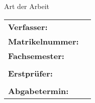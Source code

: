 \begin{titlepage}
    \begin{center}
    	\vfill
    	\begingroup
            \fontsize{14pt}{20pt}\selectfont
            {\bfseries \hochschule\par}
            {\bfseries \fakultaet\par}
            {\bfseries \studiengang\par}
        \endgroup
        \vfill
    	\begingroup
            \fontsize{18pt}{22pt}\selectfont
            {\bfseries \titel\par}
            \fontsize{16pt}{20pt}\selectfont
            {\bfseries \untertitel\par}
        \endgroup
    	\vfill
    	\begingroup
        	\fontsize{12pt}{12pt}\selectfont
        	{Art der Arbeit\par}
        \endgroup
        \vfill
        \begin{flushleft}
        	\begin{tabular}{ll}
        		\textbf{Verfasser:} & \autor\\
        		\textbf{Matrikelnummer:} & \matrikelNr\\
        		\textbf{Fachsemester:} & \fachsemester \\
        		&\\
        		\textbf{Erstprüfer:} & \erstPruefer\\
        		&\\
        		\textbf{Abgabetermin:} & \abgabeTermin\\
        	\end{tabular}
        \end{flushleft}
    \end{center}
\end{titlepage}